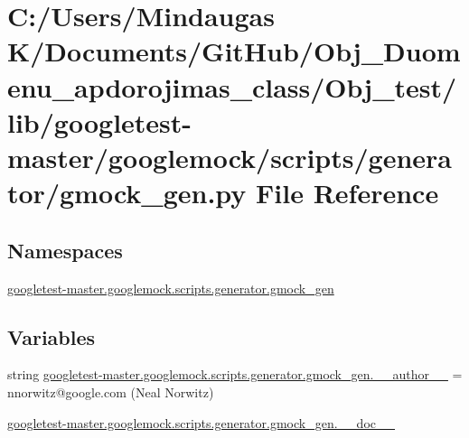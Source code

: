 \hypertarget{_obj__test_2lib_2googletest-master_2googlemock_2scripts_2generator_2gmock__gen_8py}{}\section{C\+:/\+Users/\+Mindaugas K/\+Documents/\+Git\+Hub/\+Obj\+\_\+\+Duomenu\+\_\+apdorojimas\+\_\+class/\+Obj\+\_\+test/lib/googletest-\/master/googlemock/scripts/generator/gmock\+\_\+gen.py File Reference}
\label{_obj__test_2lib_2googletest-master_2googlemock_2scripts_2generator_2gmock__gen_8py}
\subsection*{Namespaces}
\begin{DoxyCompactItemize}
\item 
 \mbox{\hyperlink{namespacegoogletest-master_1_1googlemock_1_1scripts_1_1generator_1_1gmock__gen}{googletest-\/master.\+googlemock.\+scripts.\+generator.\+gmock\+\_\+gen}}
\end{DoxyCompactItemize}
\subsection*{Variables}
\begin{DoxyCompactItemize}
\item 
string \mbox{\hyperlink{namespacegoogletest-master_1_1googlemock_1_1scripts_1_1generator_1_1gmock__gen_a3337671edd4d81071da746c9511a7764}{googletest-\/master.\+googlemock.\+scripts.\+generator.\+gmock\+\_\+gen.\+\_\+\+\_\+author\+\_\+\+\_\+}} = \textquotesingle{}nnorwitz@google.\+com (Neal Norwitz)\textquotesingle{}
\item 
\mbox{\hyperlink{namespacegoogletest-master_1_1googlemock_1_1scripts_1_1generator_1_1gmock__gen_a60fb9ddea489583bfe1f07b544ada033}{googletest-\/master.\+googlemock.\+scripts.\+generator.\+gmock\+\_\+gen.\+\_\+\+\_\+doc\+\_\+\+\_\+}}
\end{DoxyCompactItemize}
